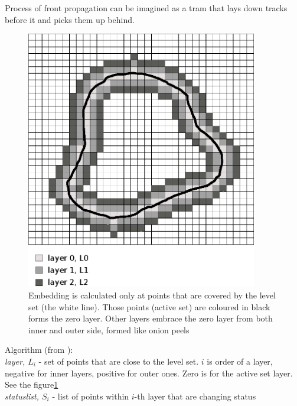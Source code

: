 \par
Process of front propagation can be imagined as a tram that lays down tracks before it and picks them up behind.

\begin{figure}
    \centering
    \includegraphics[width=0.9\textwidth]{data/sparsefield}
    \caption[Sparse fields method computation illustration]{Embedding is calculated only at points that are covered by the level set (the white line). Those points (active set) are coloured in black forms the zero layer. Other layers embrace the zero layer from both inner and outer side, formed like onion peels}
    \label{fg:sparseFilelds}
\end{figure}

\par
Algorithm (from \cite{insightIntoImages}):\\
\label{alg:sparseFileld}
\emph{layer, $L_i$} - set of points that are close to the level set. $i$ is order of a layer, negative for inner layers, positive for outer ones. 
Zero is for the active set layer. See the figure\ref{fg:sparseFilelds}\\
\emph{statuslist, $S_{i}$} - list of points within $i$-th layer that are changing status

